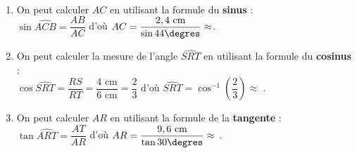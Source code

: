 \ \\ [-5mm]
   \begin{enumerate}
      \item On peut calculer $AC$ en utilisant la formule du \textbf{sinus} : \\
   $\sin\widehat{ACB}=\dfrac{AB}{AC}$ d'où $AC =\dfrac{2,4 \text{ cm}}{\sin 44\degres} \approx $.
      \item On peut calculer la mesure de l'angle $\widehat{SRT}$ en utilisant la formule du \textbf{cosinus} : \\
   $\cos \widehat{SRT}=\dfrac{RS}{RT} =\dfrac{4 \text{ cm}}{6 \text{ cm}} =\dfrac23$ d'où $\widehat{SRT} =\cos^{-1}\left(\dfrac23\right) \approx$ .
      \item On peut calculer $AR$ en utilisant la formule de la \textbf{tangente} : \\
   $\tan\widehat{ART}=\dfrac{AT}{AR}$ d'où $AR =\dfrac{9,6 \text{ cm}}{\tan 30\degres} \approx$ .
   \end{enumerate}
